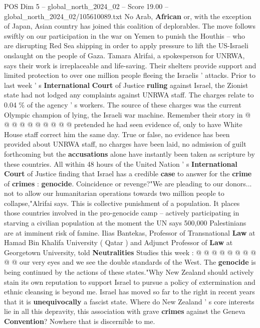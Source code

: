 \begin{textsample}{POS Dim 5 – global\_north\_2024\_02 – Score 19.00 – global\_north\_2024\_02/105610089.txt}
No Arab, \textbf{African} or, with the exception of Japan, Asian country has joined this coalition of deplorables.
The move follows swiftly on our participation in the war on Yemen to punish the Houthis -- who are disrupting Red Sea shipping in order to apply pressure to lift the US-Israeli onslaught on the people of Gaza.
Tamara Alrifai, a spokesperson for UNRWA, says their work is irreplaceable and life-saving.
Their shelters provide support and limited protection to over one million people fleeing the Israelis ' attacks.
Prior to last week ' s \textbf{International} \textbf{Court} of Justice \textbf{ruling} against Israel, the Zionist state had not lodged any complaints against UNRWA staff.
The charges relate to 0.04 \% of the agency ' s workers.
The source of these charges was the current Olympic champion of lying, the Israeli war machine.
Remember their story in @ @ @ @ @ @ @ @ @ @ pretended he had seen evidence of, only to have White House staff correct him the same day.
True or false, no evidence has been provided about UNRWA staff, no charges have been laid, no admission of guilt forthcoming but the \textbf{accusations} alone have instantly been taken as scripture by these countries.
All within 48 hours of the United Nation ' s \textbf{International} \textbf{Court} of Justice finding that Israel has a credible \textbf{case} to answer for the \textbf{crime} of \textbf{crimes} : \textbf{genocide}.
Coincidence or revenge?"We are pleading to our donors... not to allow our humanitarian operations towards two million people to collapse,"Alrifai says.
This is collective punishment of a population.
It places those countries involved in the pro-genocide camp -- actively participating in starving a civilian population at the moment the UN says 500,000 Palestinians are at imminent risk of famine.
Ilias Bantekas, Professor of Transnational \textbf{Law} at Hamad Bin Khalifa University ( Qatar ) and Adjunct Professor of \textbf{Law} at Georgetown University, told \textbf{Neutralities} Studies this week : @ @ @ @ @ @ @ @ @ @ our very eyes and we see the double standards of the West.
The \textbf{genocide} is being continued by the actions of these states."Why New Zealand should actively stain its own reputation to support Israel to pursue a policy of extermination and ethnic cleansing is beyond me.
Israel has moved so far to the right in recent years that it is \textbf{unequivocally} a fascist state.
Where do New Zealand ' s core interests lie in all this depravity, this association with grave \textbf{crimes} against the Geneva \textbf{Convention}?
Nowhere that is discernible to me.

\end{textsample}
